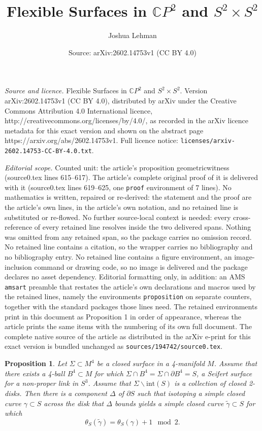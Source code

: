 \documentclass[10pt,a4paper]{amsart}
\title{Flexible Surfaces in $\mathbb{C}P^2$ and $S^2 \times S^2$}
\author{Joshua Lehman}
\date{Source: arXiv:2602.14753v1 (CC BY 4.0)}
\newtheorem{proposition}{Proposition}
\begin{document}
\maketitle

\noindent\emph{Source and licence.} Flexible Surfaces in $\mathbb{C}P^2$ and $S^2 \times S^2$. Version arXiv:2602.14753v1 (CC BY 4.0), distributed by arXiv under the Creative Commons Attribution 4.0 International licence, http://creativecommons.org/licenses/by/4.0/, as recorded in the arXiv licence metadata for this exact version and shown on the abstract page https://arxiv.org/abs/2602.14753v1. Full licence notice: \texttt{licenses/arxiv-2602.14753-CC-BY-4.0.txt}.\par\smallskip

\noindent\textit{Editorial scope.} Counted unit: the article's proposition geometricwitness (source0.tex lines 615--617). The article's complete original proof of it is delivered with it (source0.tex lines 619--625, one \texttt{proof} environment of 7 lines). No mathematics is written, repaired or re-derived: the statement and the proof are the article's own lines, in the article's own notation, and no retained line is substituted or re-flowed.  No further source-local context is needed: every cross-reference of every retained line resolves inside the two delivered spans.  Nothing was omitted from any retained span, so the package carries no omission record.  No retained line contains a citation, so the wrapper carries no bibliography and no bibliography entry.  No retained line contains a figure environment, an image-inclusion command or drawing code, so no image is delivered and the package declares no asset dependency.  Editorial formatting only, in addition: an AMS \texttt{amsart} preamble that restates the article's own declarations and macros used by the retained lines, namely the environments \texttt{proposition} on separate counters, together with the standard packages those lines need.  The retained environments print in this document as Proposition 1 in order of appearance, whereas the article prints the same items with the numbering of its own full document.  The complete native source of the article as distributed in the arXiv e-print for this exact version is bundled unchanged as \texttt{sources/194742/source0.tex}.
\begin{proposition} \label{geometricwitness}
Let $\Sigma \subset M^4$ be a closed surface in a 4-manifold $M$. Assume that there exists a 4-ball $B^4 \subset M$ for which $\Sigma \cap B^4 = \Sigma \cap \partial B^4 = S$, a Seifert surface for a non-proper link in $S^3$. Assume that $\Sigma \backslash \textrm{int}(S)$ is a collection of closed 2-disks. Then there is a component $\Delta$ of $\partial S$ such that isotoping a simple closed curve $\gamma \subset S$ across the disk that $\Delta$ bounds yields a simple closed curve $\widetilde{\gamma} \subset S$ for which \[\theta_{S}(\widetilde{\gamma}) = \theta_S(\gamma) +1 \mod 2. \]
\end{proposition}
\end{document}
